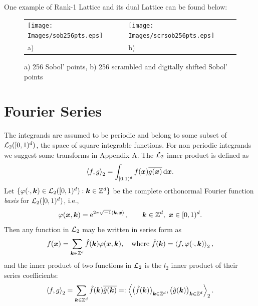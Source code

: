 \documentclass[graybox,footinfo]{svmult}
\newcommand{\Z}{\mathbb{Z}} %
\newcommand{\bsx}{\boldsymbol{x}}    %
\begin{document}
One example of Rank-1 Lattice and its dual Lattice can be found below:
\begin{figure}[h!]
\centering
\begin{tabular}{>{\centering}p{5cm}>{\centering}p{5cm}}
\texttt{[image: Images/sob256pts.eps]} &
\texttt{[image: Images/scrsob256pts.eps]}\tabularnewline
a) & b)
\end{tabular}
\caption{a) 256 Sobol' points, b) 256 scrambled and digitally shifted Sobol' points \label{Sobolfig}}
\end{figure}

\section{Fourier Series}

The integrands are assumed to be periodic and belong to some subset of $\mathcal{L}_2([0,1)^d)$, the space of square integrable functions. For non periodic integrands we suggest some transforms in Appendix A. The $\mathcal{L}_2$ inner product is defined as
\[
\ip[2]{f}{g} = \int_{\cube} f(\bsx) \overline{g(\bsx)} \, \dif \bsx.
\]
Let $\{\varphi(\cdot,\bsk) \in \cl_2(\cube) : \bsk \in \Z^d\}$ be the complete orthonormal Fourier function \emph{basis} for $\mathcal{L}_2([0,1)^d)$, i.e.,
\[
\varphi(\bsx,\bsk)  = \me^{2 \pi \sqrt{-1} \ip{\bsk}{\bsx}}, \qquad \bsk \in \Z^d, \ \bsx \in \cube.
\]
Then any function in $\mathcal{L}_2$ may be written in series form as
\begin{equation} \label{Fourierdef}
f(\bsx) = \sum_{\bsk \in \Z^d} \hf(\bsk) \varphi(\bsx,\bsk), \quad \text{where } \hf(\bsk) = \ip[2]{f}{\varphi(\cdot,\bsk)},
\end{equation}
and the inner product of two functions in $\mathcal{L}_2$ is the $l_2$ inner product of their series coefficients:
\[
\ip[2]{f}{g} = \sum_{\bsk \in \Z^d} \hf(\bsk)\overline{\hg(\bsk)} =: \ip[2]{\bigl(\hf(\bsk)\bigr)_{\bsk \in \Z^d}}{\bigl ( \hg(\bsk)\bigr )_{\bsk \in \Z^d}}.
\]
\end{document}

